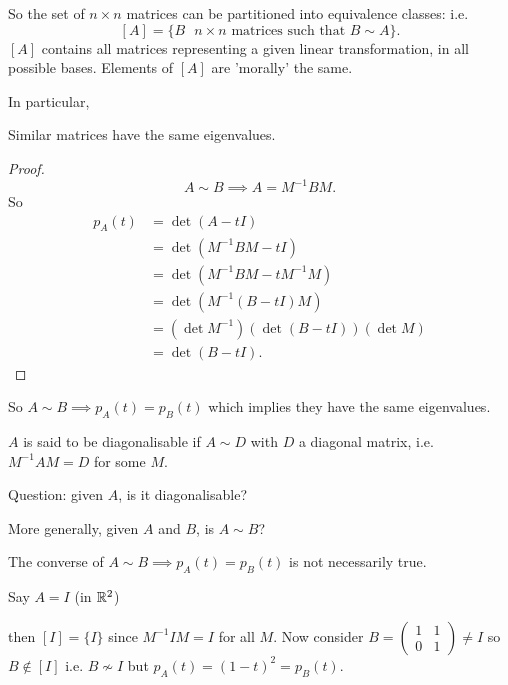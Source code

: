 \documentclass[10pt, a4paper]{article}
\begin{document}
So the set of $n \times n$ matrices can be partitioned into equivalence classes:
i.e.
\[
[A] = \{B \text{ $n\times n$ matrices such that $B \sim A$}\}.
\]
$[A]$ contains all matrices representing a given linear transformation,
in all possible bases.
Elements of $[A]$ are 'morally' the same.

In particular,
\begin{proposition}
    Similar matrices have the same eigenvalues.
    \begin{proof}
        \[
        A \sim B \implies A = M ^ {-1}BM.
        \]
        So
        \begin{align*}
            p_A(t) &= \det(A - tI) \\
            &= \det(M ^ {-1}BM - tI) \\
            &= \det(M ^ {-1}BM - tM ^ {-1}M) \\
            &= \det(M ^ {-1}(B - tI)M) \\
            &= (\det{M ^ {-1}})(\det(B - tI))(\det{M}) \\
            &= \det(B - tI).
        \end{align*}
    \end{proof}
\end{proposition}
So $A \sim B \implies p_A(t) = p_B(t)$ which implies they have the same eigenvalues.

\begin{definition}
    $A$ is said to be diagonalisable if $A \sim D$ with $D$ a diagonal matrix,
    i.e. $M ^ {-1}AM = D$ for some $M$.
\end{definition}
 
Question:
given $A$,
is it diagonalisable?

More generally,
given $A$ and $B$,
is $A \sim B$?

The converse of $A \sim B \implies p_A(t) = p_B(t)$ is not necessarily true.
\begin{example}
    Say $A = I$
    (in $\mathbb{R} ^ 2$)

    then $[I] = \{I\}$
    since $M ^ {-1}IM = I$ for all $M$.
    Now consider $B = \begin{pmatrix}
        1 & 1 \\ 0 & 1
    \end{pmatrix} \neq I$ so $B \notin [I]$ i.e. $B \nsim I$
    but $p_A(t) = (1 - t) ^ 2 = p_B(t)$.
\end{example}
\end{document}
